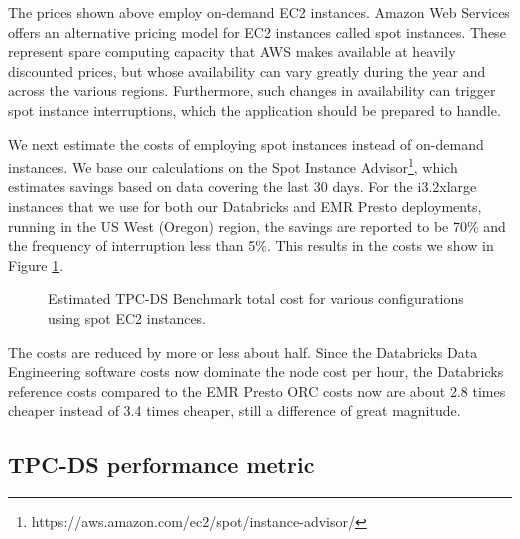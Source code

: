 The prices shown above employ on-demand EC2 instances. Amazon Web Services offers an alternative pricing model for EC2 instances called spot instances. These represent spare computing capacity that AWS makes available at heavily discounted prices, but whose availability can vary greatly during the year and across the various regions. Furthermore, such changes in availability can trigger spot instance interruptions, which the application should be prepared to handle.

We next estimate the costs of employing spot instances instead of on-demand instances. We base our calculations on the Spot Instance Advisor\footnote{https://aws.amazon.com/ec2/spot/instance-advisor/}, which estimates savings based on data covering the last 30 days. For the i3.2xlarge instances that we use for both our Databricks and EMR Presto deployments, running in the US West (Oregon) region, the savings are reported to be 70\% and the frequency of interruption less than 5\%. This results in the costs we show in Figure \ref{fig:resultsSummaryTotalCostsWithDiscount}.

\begin{figure}
   \begin{center}
   \end{center}
   \caption{Estimated TPC-DS Benchmark total cost for various configurations using spot EC2 instances.}
   \label{fig:resultsSummaryTotalCostsWithDiscount}
\end{figure}

The costs are reduced by more or less about half. Since the Databricks Data Engineering software costs now dominate the node cost per hour, the Databricks reference costs compared to the EMR Presto ORC costs now are about 2.8 times cheaper instead of 3.4 times cheaper, still a difference of great magnitude.

\subsection{TPC-DS performance metric}\label{resultsSummaryPerformanceMetric}
